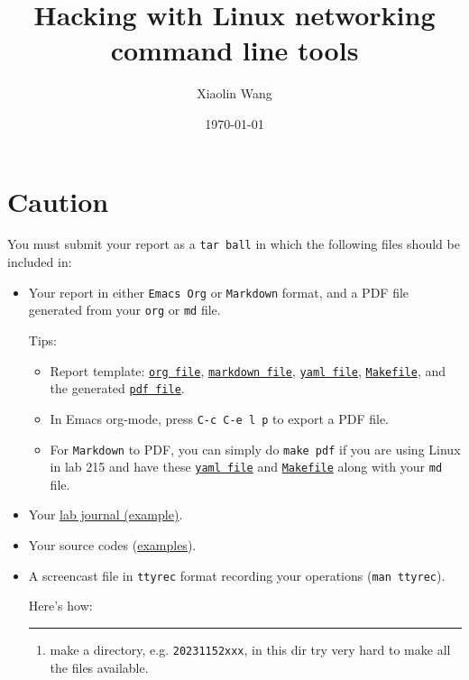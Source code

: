 \documentclass{article}
\author{Xiaolin Wang}
\date{\today}
\title{Hacking with Linux networking command line tools}
\begin{document}
\maketitle
\tableofcontents

\section{Caution}
\label{sec:org982228c}
You must submit your report as a \texttt{tar ball} in which the following files
should be included in:

\begin{itemize}
\item Your report in either \texttt{Emacs Org} or \texttt{Markdown} format, and a PDF file
generated from your \texttt{org} or \texttt{md} file.

Tips: 
\begin{itemize}
\item Report template: \href{20231152xxx.org}{\texttt{org file}}, \href{20231152xxx.md}{\texttt{markdown file}},
\href{20231152xxx.yaml}{\texttt{yaml file}}, \href{Makefile}{\texttt{Makefile}}, and the generated \href{20231152xxx.pdf}{\texttt{pdf file}}.

\item In Emacs org-mode, press \texttt{C-c C-e l p} to export a PDF file.

\item For \texttt{Markdown} to PDF, you can simply do \texttt{make pdf} if you are
using Linux in lab 215 and have these \href{20231152xxx.yaml}{\texttt{yaml file}} and \href{Makefile}{\texttt{Makefile}}
along with your \texttt{md} file.
\end{itemize}

\item Your \href{20231152xxx-实习日志.pdf}{lab journal (example)}.

\item Your source codes (\href{https://cs6.swfu.edu.cn/\~wx672/lecture\_notes/network\_basics/scripts/}{examples}).

\item A screencast file in \texttt{ttyrec} format recording your operations (\texttt{man ttyrec}).

Here's how:

\noindent\rule{\textwidth}{0.5pt}
\begin{enumerate}
\item make a directory, e.g. \texttt{20231152xxx}, in this dir try very hard to make all
the files available.


\end{enumerate}
\end{itemize}
\end{document}
